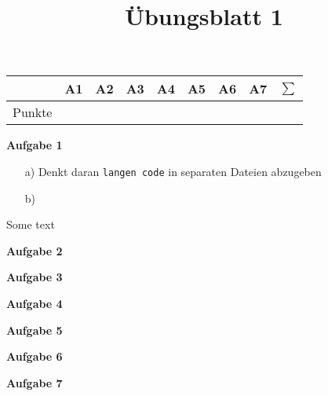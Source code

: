 \documentclass[a4paper, fleqn]{article}
\title{Übungsblatt 1}
\author{}
\newcommand{\code}[1]{\texttt{#1}}
\newcommand{\aufgabe}[1]{\vspace{10pt} \textbf{}\noindent \large \textbf{Aufgabe #1} \textit{} \vspace{10pt}
    \noindent \normalsize}
\begin{document}
\pagestyle{fancy}

\begin{table}[h]
    \begin{flushright}
        \begin{tabular}{c|c|c|c|c|c|c|c|c}
             & A1 & A2 & A3 & A4 & A5 & A6 &A7 & $\sum$ \\
            \hline Punkte & & & & & & & &
        \end{tabular}
    \end{flushright}
\end{table}

    \aufgabe{1}
        \begin{enumerate}
            \item [a)] Denkt daran \code{langen code} in separaten Dateien abzugeben
            \item [b)] 
        \end{enumerate}
    
    Some text
    
    \aufgabe{2}

    \aufgabe{3}
    
    \aufgabe{4}

    \aufgabe{5}
    
    \aufgabe{6}
        
    \aufgabe{7}
    
\end{document}
